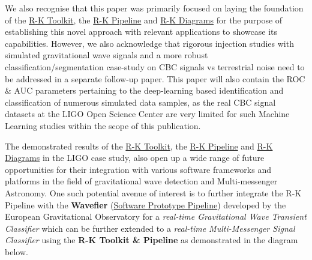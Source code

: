 We also recognise that this paper was primarily focused on laying the foundation of the \hyperref[subsec:R-K Toolkit]{R-K Toolkit}, the \hyperref[subsec:R-K Pipeline]{R-K Pipeline} and \hyperref[subsec:R-K Diagram]{R-K Diagrams} for the purpose of establishing this novel approach with relevant applications to showcase its capabilities. However, we also acknowledge that rigorous injection studies with simulated gravitational wave signals and a more robust classification/segmentation case-study on CBC signals vs terrestrial noise need to be addressed in a separate follow-up paper. This paper will also contain the ROC \& AUC parameters pertaining to the deep-learning based identification  and classification of numerous simulated data samples, as the real CBC signal datasets at the LIGO Open Science Center \cite{00_LIGOOpenSciData} are very limited for such Machine Learning studies within the scope of this publication.

The demonstrated results of the \hyperref[subsec:R-K Toolkit]{R-K Toolkit}, the \hyperref[subsec:R-K Pipeline]{R-K Pipeline} and \hyperref[subsec:R-K Diagram]{R-K Diagrams} in the LIGO case study, also open up a wide range of future opportunities for their integration with various software frameworks and platforms in the field of gravitational wave detection and Multi-messenger Astronomy. One such potential avenue of interest is to further integrate the R-K Pipeline with the \textbf{Wavefier} (\href{https://commpla.com/works/wavefier/}{Software Prototype Pipeline}) developed by the European Gravitational Observatory for a \textit{real-time Gravitational Wave Transient Classifier} which can be further extended to a \textit{real-time Multi-Messenger Signal Classifier} using the \textbf{R-K Toolkit \& Pipeline} as demonstrated in the diagram below.\cite{25.7_cuoco2022Wavefier}

